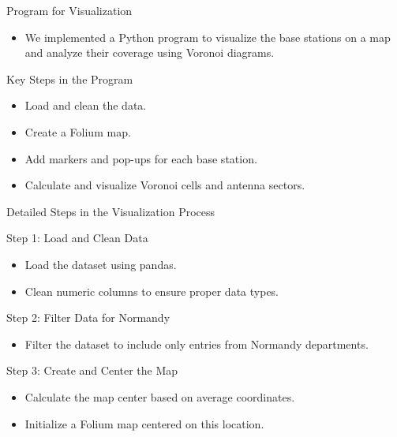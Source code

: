 \begin{frame}{Program for Visualization}
    \begin{itemize}
        \item We implemented a Python program to visualize the base stations on a map and analyze their coverage using Voronoi diagrams.
    \end{itemize}
    \begin{block}{Key Steps in the Program}
        \begin{itemize}
            \item Load and clean the data.
            \item Create a Folium map.
            \item Add markers and pop-ups for each base station.
            \item Calculate and visualize Voronoi cells and antenna sectors.
        \end{itemize}
    \end{block}
\end{frame}
    
\begin{frame}{Detailed Steps in the Visualization Process}
    \begin{block}{Step 1: Load and Clean Data}
        \begin{itemize}
            \item Load the dataset using pandas.
            \item Clean numeric columns to ensure proper data types.
        \end{itemize}
    \end{block}
    \begin{block}{Step 2: Filter Data for Normandy}
        \begin{itemize}
            \item Filter the dataset to include only entries from Normandy departments.
        \end{itemize}
    \end{block}
    \begin{block}{Step 3: Create and Center the Map}
        \begin{itemize}
            \item Calculate the map center based on average coordinates.
            \item Initialize a Folium map centered on this location.
        \end{itemize}
    \end{block}
\end{frame}
    

